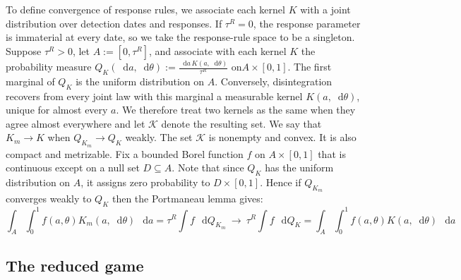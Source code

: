 \documentclass[12pt,reqno]{article}
\newcommand{\de}{\mathop{}\!\mathrm{d}}
\theoremstyle{definition} \newtheorem{example}{Example}
\theoremstyle{definition} \newtheorem{condition}{Condition}
\theoremstyle{definition} \newtheorem{corollary}{Corollary}
\theoremstyle{definition} \newtheorem{claim}{Claim}
\theoremstyle{definition} \newtheorem{definition}{Definition}
\theoremstyle{definition} \newtheorem{conjecture}{Conjecture}
\theoremstyle{definition} \newtheorem{Lemma}{Lemma}
\theoremstyle{definition} \newtheorem{lemma}{Lemma}
\theoremstyle{plain} \newtheorem{theorem}{Theorem}
\theoremstyle{definition} \newtheorem{assumption}{Assumption}
\theoremstyle{definition} \newtheorem*{assumptionnonumber}{Assumption}
\theoremstyle{definition} \newtheorem*{theoremNoNumber}{Proposition}
\theoremstyle{definition}
\theoremstyle{definition}\newtheorem{proposition}{Proposition}
\theoremstyle{definition} \newtheorem{result}{Result}
\theoremstyle{definition} \newtheorem*{definitionNoNumber}{Definition}
\theoremstyle{definition} \newtheorem{Definition}{Definition}
\theoremstyle{definition} \newtheorem*{DefinitionNoNumber}{Definition}
\theoremstyle{definition} \newtheorem*{fact}{Fact}
\theoremstyle{definition} \newtheorem*{property}{Property}
\theoremstyle{definition} \newtheorem{remark}{Remark}
\begin{document}
To define convergence of response rules, we associate each kernel \(K\) with a joint distribution over detection dates and responses. If $\tau^R=0$, the response parameter is immaterial at every date, so we take the response-rule space to be a singleton. Suppose $\tau^R>0$, let $A:=[0,\tau^R]$, and associate with each kernel $K$ the probability measure
$
Q_K(\de a,\de\theta):=\frac{\de a \, K(a,\de\theta)}{\tau^R}$ on$A\times[0,1].$  The first marginal of $Q_K$ is the uniform distribution on $A$. Conversely, disintegration recovers from every joint law with this marginal a measurable kernel $K(a,\de\theta)$, unique for almost every $a$. We therefore treat two kernels as the same when they agree almost everywhere and let $\mathcal K$ denote the resulting set. We say that $K_m\to K$ when $Q_{K_m}\to Q_K$ weakly. The set $\mathcal K$ is nonempty and convex. It is also compact and metrizable. Fix a bounded Borel function $f$ on $A \times [0,1]$ that is continuous except on a null set $D \subseteq A$. Note that since $Q_K$ has the uniform distribution on $A$, it  assigns zero probability to $D\times[0,1]$. Hence if $Q_{K_m}$ converges weakly to $Q_K$ then the Portmaneau lemma gives: 
\[
\int_A\!\!\int_0^1 f(a,\theta)K_m(a,\de\theta)\,\de a
=\tau^R\!\int f\,\de Q_{K_m}
\ \longrightarrow\
\tau^R\!\int f\,\de Q_K
=\int_A\!\!\int_0^1 f(a,\theta)K(a,\de\theta)\,\de a
\tag{J}\label{eq:joint-conv}
\]



\subsection{The reduced game}\label{app:ex-reduced}
\end{document}
